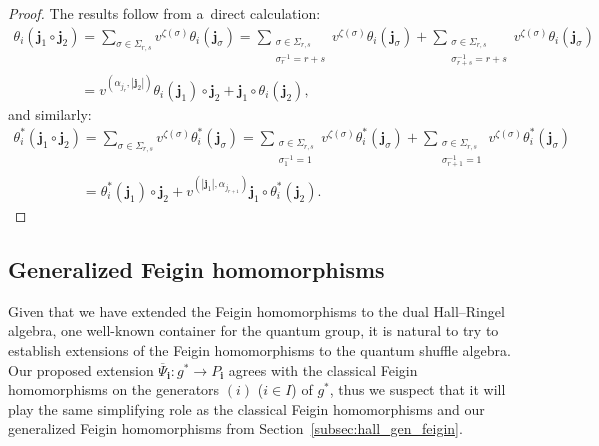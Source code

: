 \documentclass[pdftex]{sigma}
\numberwithin{equation}{section}
\begin{document}
\begin{proof}
The results follow from a~direct calculation:
\begin{gather*}
\theta_i(\mathbf{j}_1\circ\mathbf{j}_2)
=\sum\limits_{\sigma\in\Sigma_{r,s}}v^{\zeta(\sigma)}\theta_i(\mathbf{j}_\sigma)
=\sum\limits_{\substack{\sigma\in\Sigma_{r,s}\\ \sigma^{-1}_r=r+s}}v^{\zeta(\sigma)}\theta_i(\mathbf{j}_\sigma)
+\sum\limits_{\substack{\sigma\in\Sigma_{r,s}\\ \sigma^{-1}_{r+s}=r+s}}v^{\zeta(\sigma)}\theta_i(\mathbf{j}_\sigma)
\\
\phantom{\theta_i(\mathbf{j}_1\circ\mathbf{j}_2)}
 =v^{(\alpha_{j_r},|\mathbf{j}_2|)}\theta_i(\mathbf{j}_1)\circ\mathbf{j}_2+\mathbf{j}_1\circ\theta_i(\mathbf{j}_2), %
\end{gather*}
and similarly:
\begin{gather*}
\theta^*_i(\mathbf{j}_1\circ\mathbf{j}_2)
=\sum\limits_{\sigma\in\Sigma_{r,s}}v^{\zeta(\sigma)}\theta^*_i(\mathbf{j}_\sigma)
=\sum\limits_{\substack{\sigma\in\Sigma_{r,s}\\ \sigma^{-1}_1=1}}v^{\zeta(\sigma)}\theta^*_i(\mathbf{j}_\sigma)
+\sum\limits_{\substack{\sigma\in\Sigma_{r,s}\\ \sigma^{-1}_{r+1}=1}}v^{\zeta(\sigma)}\theta^*_i(\mathbf{j}_\sigma)
\\
\phantom{\theta^*_i(\mathbf{j}_1\circ\mathbf{j}_2)}
 =\theta^*_i(\mathbf{j}_1)\circ\mathbf{j}_2+v^{(|\mathbf{j}_1|,\alpha_{j_{r+1}})}\mathbf{j}_1\circ\theta^*_i(\mathbf{j}_2).  \tag*{\qed}
\end{gather*}
\renewcommand{\qed}{}
\end{proof}


\subsection{Generalized Feigin homomorphisms}
\label{subsec:shuffle_gen_feigin}
Given that we have extended the Feigin homomorphisms to the dual Hall--Ringel algebra, one well-known container for the
quantum group, it is natural to try to establish extensions of the Feigin homomorphisms to the quantum shuf\/f\/le algebra.
Our proposed extension $\overline\Psi_\mathbf{i}: g^*\to P_\mathbf{i}$ agrees with the classical Feigin homomorphisms on
the generators $(i)$ ($i\in I$) of $g^*$, thus we suspect that it will play the same simplifying role as the classical
Feigin homomorphisms and our generalized Feigin homomorphisms from Section~\ref{subsec:hall_gen_feigin}.
\end{document}
